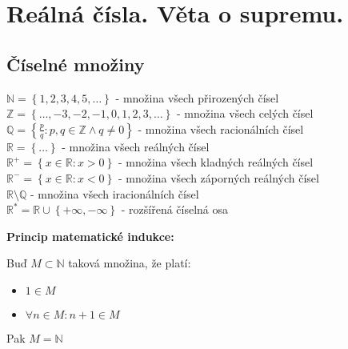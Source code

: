 \section{Reálná čísla. Věta o supremu.}
\subsection{Číselné množiny}

\( \mathbb{N} = \left\{1, 2, 3, 4, 5, \dots \right\} \) - množina všech přirozených čísel \\
\( \mathbb{Z} = \left\{\dots, -3, -2, -1, 0, 1, 2, 3, \dots \right\} \) - množina všech celých čísel \\
\( \mathbb{Q} = \left\{\frac{p}{q} : p, q \in \mathbb{Z} \land q \neq 0 \right\} \) - množina všech racionálních čísel \\
\( \mathbb{R} = \left\{\dots \right\} \) - množina všech reálných čísel \\
\( \mathbb{R}^+ = \left\{x \in \mathbb{R} : x > 0 \right\} \) - množina všech kladných reálných čísel \\
\( \mathbb{R}^- = \left\{x \in \mathbb{R} : x < 0 \right\} \) - množina všech záporných reálných čísel \\
\( \mathbb{R} \setminus \mathbb{Q} \) - množina všech iracionálních čísel \\
\( \mathbb{R}^* = \mathbb{R} \cup \left\{+\infty, -\infty \right\} \) - rozšířená číselná osa

\bigskip

\noindent \textbf{Princip matematické indukce:}

Buď \( M \subset \mathbb{N} \) taková množina, že platí:
\begin{itemize}
    \item \( 1 \in M \)
    \item \( \forall n \in M : n + 1 \in M \)
\end{itemize}

Pak \( M = \mathbb{N} \)

\bigskip

